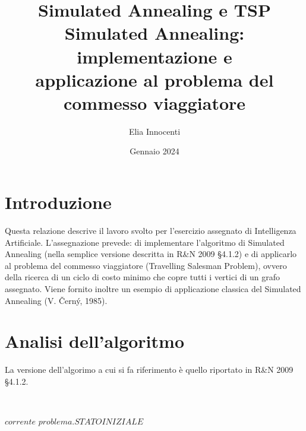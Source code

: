 \documentclass[11pt]{article}
\title{Simulated Annealing e TSP \\
       \vspace{0.5em}
       \large Simulated Annealing: implementazione e \\
              applicazione al problema del commesso viaggiatore}
\author{Elia Innocenti}
\date{Gennaio 2024}
\begin{document}

    \maketitle

    \section{Introduzione} \label{sec:introduction}

        Questa relazione descrive il lavoro svolto per l'esercizio assegnato di Intelligenza Artificiale.
        L'assegnazione prevede: di implementare l'algoritmo di Simulated Annealing (nella semplice versione descritta in R&N 2009 §4.1.2) e
        di applicarlo al problema del commesso viaggiatore (Travelling Salesman Problem),
        ovvero della ricerca di un ciclo di costo minimo che copre tutti i vertici di un grafo assegnato.
        Viene fornito inoltre un esempio di applicazione classica del Simulated Annealing (V. Černý, 1985).

    \section{Analisi dell'algoritmo} \label{sec:algorithm_analysis}

        La versione dell'algorimo a cui si fa riferimento è quello riportato in R&N 2009 §4.1.2.

        \begin{algorithm}[H] \label{alg:simulated_annealing_algorithm}
            \SetAlgoLined
            \vspace{0.5em}
             \\
            \vspace{0.5em}

                $corrente$ \leftarrow $problema.STATOINIZIALE$ \\
        \end{algorithm}
\end{document}
